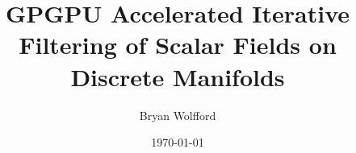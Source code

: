 \documentclass[openany]{book}
\author{Bryan Wolfford}
\title{GPGPU Accelerated Iterative Filtering of Scalar Fields on Discrete Manifolds}
\date{\today}
\begin{document}

%
\mainmatter



%



%



%
\appendix


%
\backmatter
\printindex
{}

\end{document}
